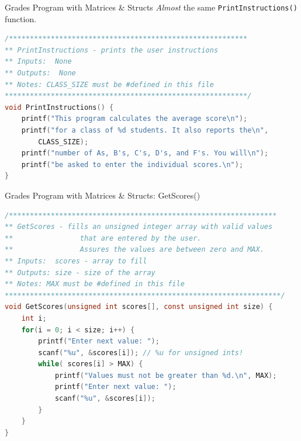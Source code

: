 \documentclass[graphics]{beamer}
\begin{document}
\begin{frame}[fragile]{Grades Program with Matrices \& Structs}
    \textit{Almost} the same \texttt{PrintInstructions()} function.
    \begin{lstlisting}[language=C,basicstyle=\scriptsize,keywordstyle=\color{blue},commentstyle=\color{green},showstringspaces=false,stringstyle=\color{red}]
/*********************************************************
** PrintInstructions - prints the user instructions
** Inputs:  None
** Outputs:  None
** Notes: CLASS_SIZE must be #defined in this file
**********************************************************/
void PrintInstructions() {
    printf("This program calculates the average score\n");
    printf("for a class of %d students. It also reports the\n",
        CLASS_SIZE);
    printf("number of As, B's, C's, D's, and F's. You will\n");
    printf("be asked to enter the individual scores.\n");
}
    \end{lstlisting}
\end{frame}

\begin{frame}[fragile]{Grades Program with Matrices \& Structs: GetScores()}
    \begin{lstlisting}[language=C,basicstyle=\scriptsize,keywordstyle=\color{blue},commentstyle=\color{green},showstringspaces=false,stringstyle=\color{red}]
/****************************************************************
** GetScores - fills an unsigned integer array with valid values
**                that are entered by the user.  
**                Assures the values are between zero and MAX.
** Inputs:  scores - array to fill
** Outputs: size - size of the array
** Notes: MAX must be #defined in this file
******************************************************************/
void GetScores(unsigned int scores[], const unsigned int size) {
    int i;
    for(i = 0; i < size; i++) {
        printf("Enter next value: ");
        scanf("%u", &scores[i]); // %u for unsigned ints!
        while( scores[i] > MAX) {
            printf("Values must not be greater than %d.\n", MAX);
            printf("Enter next value: ");
            scanf("%u", &scores[i]);
        }
    }
}
    \end{lstlisting}
\end{frame}
\end{document}

